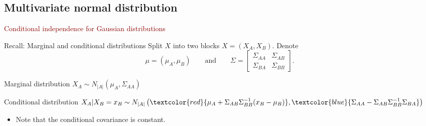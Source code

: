 \documentclass[11pt,handout,aspectratio=169,dvipsnames]{beamer}
\begin{document}
\subsection{Multivariate normal distribution}
\begin{frame}{}
\begin{center}
	{\huge \textcolor{DarkRed}{Conditional independence for Gaussian distributions}}
\end{center}
\end{frame}



\begin{frame}{Recall: Marginal and conditional distributions}
	Split $X$ into two blocks $X=(X_A,X_B)$. Denote $$\mu=(\mu_A,\mu_B)\qquad\mbox{and}\qquad\Sigma=\begin{bmatrix}
		\Sigma_{AA} & \Sigma_{AB}\\
		\Sigma_{BA} & \Sigma_{BB}
	\end{bmatrix}.$$
	\begin{block}{Marginal distribution}
		$X_A\sim N_{|A|}(\mu_A,\Sigma_{AA})$
	\end{block}
	\begin{block}{Conditional distribution}
		$X_A|X_B=x_B\sim N_{|A|}\left(\textcolor{red}{\small \mu_A+\Sigma_{AB}\Sigma_{BB}^{-1}(x_B-\mu_B)},\textcolor{blue}{\small \Sigma_{AA}-\Sigma_{AB}\Sigma_{BB}^{-1}\Sigma_{BA}}\right)$
		\begin{itemize}
			\item Note that the conditional covariance is constant.
		\end{itemize}
	\end{block}
\end{frame}
\end{document}
